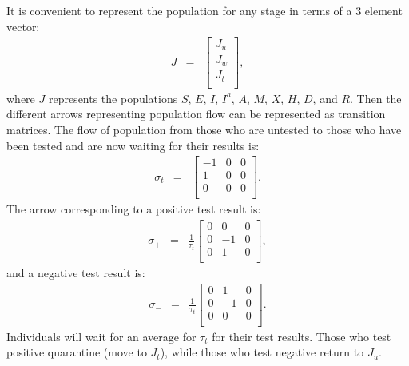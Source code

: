 \documentclass[notitlepage, superscriptaddress]{revtex4-2}
\begin{document}
It is convenient to represent the population for any stage in terms of a 3 element vector:
\begin{eqnarray} 
J &=& 
    \begin{bmatrix}
    J_{u} \\ 
    J_{w} \\
    J_{t} \\
    \end{bmatrix},
\end{eqnarray}
where $J$ represents the populations $S$, $E$, $I$, $I^{a}$, $A$, $M$, $X$, $H$, $D$, and $R$.
Then the different arrows representing population flow can be represented as transition matrices. The flow of population from those who are untested to those who have been tested and are now waiting for their results is:
\begin{eqnarray} 
\sigma_{t} &=& 
    \begin{bmatrix}
    -1 & 0 & 0 \\ 
    1 & 0 & 0 \\
    0 & 0 & 0 \\
    \end{bmatrix}.
\end{eqnarray}
The arrow corresponding to a positive test result is:
\begin{eqnarray} 
\sigma_{+} &=& \frac{1}{\tau_{t}}
    \begin{bmatrix}
    0 & 0 & 0 \\ 
    0 & -1 & 0 \\
    0 & 1 & 0 \\
    \end{bmatrix},
\end{eqnarray}
and a negative test result is:
\begin{eqnarray} 
\sigma_{-} &=& \frac{1}{\tau_{t}}
    \begin{bmatrix}
    0 & 1 & 0 \\ 
    0 & -1 & 0 \\
    0 & 0 & 0 \\
    \end{bmatrix}.
\end{eqnarray}
Individuals will wait for an average for $\tau_{t}$ for their test results. Those who test positive quarantine (move to $J_{t}$), while those who test negative return to $J_{u}$. 
\end{document}
